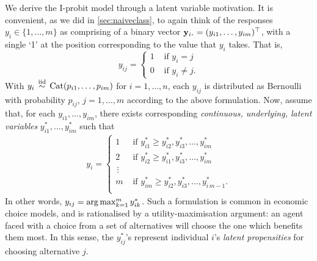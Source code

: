 We derive the I-probit model through a latent variable motivation.
It is convenient, as we did in \cref{sec:naiveclass}, to again think of the responses $y_i \in \{1,\dots,m\} $ as comprising of a binary vector $\by_{i \bigcdot} = (y_{i1},\dots,y_{im})^\top$, with a single `1' at the position corresponding to the value that $y_i$ takes. 
That is,
\[
  y_{ij} =
  \begin{cases}
    1 &\text{ if } y_i = j \\
    0 &\text{ if } y_i \neq j.
  \end{cases}
\]
With $y_i\,\overset{\text{iid}}{\sim}\,\operatorname{Cat}(p_{i1},\dots,p_{im})$ for $i=1,\dots,n$, each $y_{ij}$ is distributed as Bernoulli with probability $p_{ij}$, $j=1,\dots,m$ according to the above formulation. 
Now, assume that, for each $y_{i1}, \dots, y_{im}$, there exists corresponding \emph{continuous, underlying, latent variables} $y_{i1}^*, \dots, y_{im}^*$ such that
\begin{align}\label{eq:latentmodel}
  y_i =
  \begin{cases}
    1 &\text{ if } y_{i1}^* \geq y_{i2}^*, y_{i3}^*, \dots, y_{im}^* \\
    2 &\text{ if } y_{i2}^* \geq y_{i1}^*, y_{i3}^*, \dots, y_{im}^* \\
    \,\vdots \\
    m &\text{ if } y_{im}^* \geq y_{i2}^*, y_{i3}^*, \dots, y_{i\,m-1}^*. \\
  \end{cases}  
\end{align}
In other words, 
$y_{ij} = \operatorname*{arg\,max}_{k=1}^m y_{ik}^*$.
Such a formulation is common in economic choice models, and is rationalised by a utility-maximisation argument: an agent faced with a choice from a set of alternatives will choose the one which benefits them most.
In this sense, the $y_{ij}^*$'s represent individual $i$'s \emph{latent propensities} for choosing alternative $j$.

